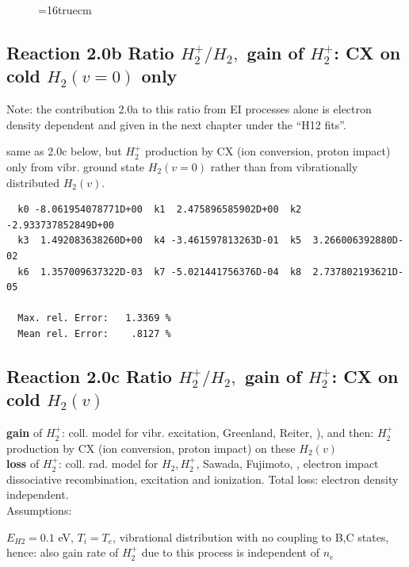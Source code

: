 \documentclass[12pt,dvips]{article}
\begin{document}
\begin{figure} \label{2.18ll}
\epsfxsize=16truecm
\end{figure}
\newpage



\subsection{
Reaction 2.0b   Ratio $H_2^+/H_2,$ gain of $H_2^+$:  CX on cold $H_2(v=0)$ only
}

Note: the contribution 2.0a to this ratio from EI processes alone is electron density dependent
and given in the next chapter under the ``H12 fits''.
\medskip

same as 2.0c below, but $H_2^+$ production by CX (ion conversion, proton impact) only from vibr. ground state $H_2(v=0)$
rather than from vibrationally distributed $H_2(v)$.


\begin{small}\begin{verbatim}
  k0 -8.061954078771D+00  k1  2.475896585902D+00  k2 -2.933737852849D+00
  k3  1.492083638260D+00  k4 -3.461597813263D-01  k5  3.266006392880D-02
  k6  1.357009637322D-03  k7 -5.021441756376D-04  k8  2.737802193621D-05

  Max. rel. Error:   1.3369 %
  Mean rel. Error:    .8127 %

\end{verbatim}\end{small}

\subsection{
Reaction 2.0c   Ratio $H_2^+/H_2,$ gain of $H_2^+$:  CX on cold $H_2(v)$
}
\textbf{gain }of $H_2^+$: coll. model for vibr. excitation, Greenland, Reiter, \cite{kn:Green}),
and then: $H_2^+$ production by CX (ion conversion, proton impact) on these $H_2(v)$\\
\textbf{loss }of $H_2^+$: coll. rad. model for $H_2, H_2^+$, Sawada, Fujimoto, \cite{kn:Sawada},
electron impact dissociative recombination, excitation and ionization. Total loss: electron density independent.\\


Assumptions:

$E_{H2} = 0.1$ eV, $T_i = T_e$, vibrational distribution with
no coupling to B,C states,
hence: also gain rate of $H_2^+$ due to this process is independent of $n_e$
\end{document}
